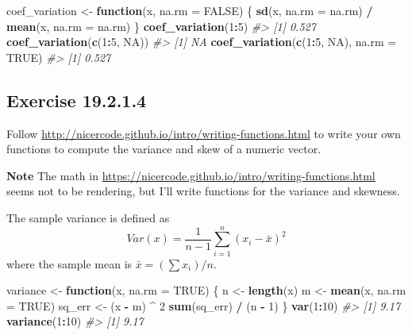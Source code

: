 \documentclass[]{book}
\newenvironment{Shaded}{\begin{snugshade}}{\end{snugshade}}
\newcommand{\CommentTok}[1]{\textcolor[rgb]{0.56,0.35,0.01}{\textit{#1}}}
\newcommand{\ControlFlowTok}[1]{\textcolor[rgb]{0.13,0.29,0.53}{\textbf{#1}}}
\newcommand{\DataTypeTok}[1]{\textcolor[rgb]{0.13,0.29,0.53}{#1}}
\newcommand{\DecValTok}[1]{\textcolor[rgb]{0.00,0.00,0.81}{#1}}
\newcommand{\KeywordTok}[1]{\textcolor[rgb]{0.13,0.29,0.53}{\textbf{#1}}}
\newcommand{\NormalTok}[1]{#1}
\newcommand{\OperatorTok}[1]{\textcolor[rgb]{0.81,0.36,0.00}{\textbf{#1}}}
\newcommand{\OtherTok}[1]{\textcolor[rgb]{0.56,0.35,0.01}{#1}}
\newcommand{\StringTok}[1]{\textcolor[rgb]{0.31,0.60,0.02}{#1}}
\theoremstyle{plain}
\theoremstyle{remark}
\begin{document}
\begin{Shaded}
\begin{Highlighting}[]
\NormalTok{coef_variation <-}\StringTok{ }\ControlFlowTok{function}\NormalTok{(x, }\DataTypeTok{na.rm =} \OtherTok{FALSE}\NormalTok{) \{}
  \KeywordTok{sd}\NormalTok{(x, }\DataTypeTok{na.rm =}\NormalTok{ na.rm) }\OperatorTok{/}\StringTok{ }\KeywordTok{mean}\NormalTok{(x, }\DataTypeTok{na.rm =}\NormalTok{ na.rm)}
\NormalTok{\}}
\KeywordTok{coef_variation}\NormalTok{(}\DecValTok{1}\OperatorTok{:}\DecValTok{5}\NormalTok{)}
\CommentTok{#> [1] 0.527}
\KeywordTok{coef_variation}\NormalTok{(}\KeywordTok{c}\NormalTok{(}\DecValTok{1}\OperatorTok{:}\DecValTok{5}\NormalTok{, }\OtherTok{NA}\NormalTok{))}
\CommentTok{#> [1] NA}
\KeywordTok{coef_variation}\NormalTok{(}\KeywordTok{c}\NormalTok{(}\DecValTok{1}\OperatorTok{:}\DecValTok{5}\NormalTok{, }\OtherTok{NA}\NormalTok{), }\DataTypeTok{na.rm =} \OtherTok{TRUE}\NormalTok{)}
\CommentTok{#> [1] 0.527}
\end{Highlighting}
\end{Shaded}

\hypertarget{exercise-19.2.1.4}{%
\subsection*{\texorpdfstring{Exercise {19.2.1.4}}{Exercise 19.2.1.4}}\label{exercise-19.2.1.4}}

Follow \url{http://nicercode.github.io/intro/writing-functions.html} to write your own functions to compute the variance and skew of a numeric vector.

\textbf{Note} The math in \url{https://nicercode.github.io/intro/writing-functions.html} seems not to be rendering, but I'll write functions for the variance and skewness.

The sample variance is defined as
\[
Var(x) = \frac{1}{n - 1} \sum_{i=1}^n (x_i - \bar{x}) ^2
\]
where the sample mean is \(\bar{x} = (\sum x_i) / n\).

\begin{Shaded}
\begin{Highlighting}[]
\NormalTok{variance <-}\StringTok{ }\ControlFlowTok{function}\NormalTok{(x, }\DataTypeTok{na.rm =} \OtherTok{TRUE}\NormalTok{) \{}
\NormalTok{  n <-}\StringTok{ }\KeywordTok{length}\NormalTok{(x)}
\NormalTok{  m <-}\StringTok{ }\KeywordTok{mean}\NormalTok{(x, }\DataTypeTok{na.rm =} \OtherTok{TRUE}\NormalTok{)}
\NormalTok{  sq_err <-}\StringTok{ }\NormalTok{(x }\OperatorTok{-}\StringTok{ }\NormalTok{m) }\OperatorTok{^}\StringTok{ }\DecValTok{2}
  \KeywordTok{sum}\NormalTok{(sq_err) }\OperatorTok{/}\StringTok{ }\NormalTok{(n }\OperatorTok{-}\StringTok{ }\DecValTok{1}\NormalTok{)}
\NormalTok{\}}
\KeywordTok{var}\NormalTok{(}\DecValTok{1}\OperatorTok{:}\DecValTok{10}\NormalTok{)}
\CommentTok{#> [1] 9.17}
\KeywordTok{variance}\NormalTok{(}\DecValTok{1}\OperatorTok{:}\DecValTok{10}\NormalTok{)}
\CommentTok{#> [1] 9.17}
\end{Highlighting}
\end{Shaded}
\end{document}
